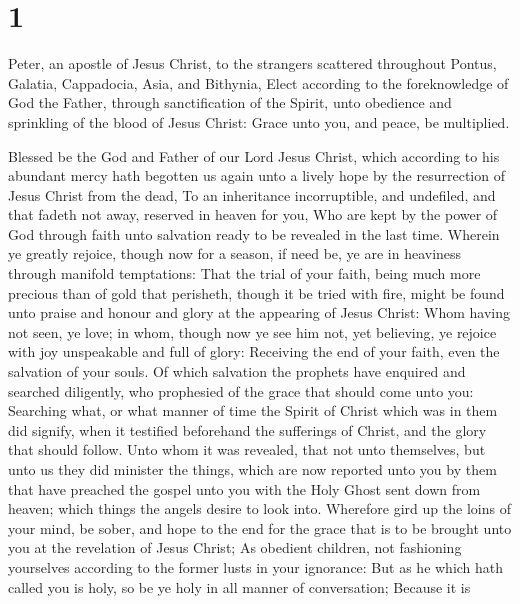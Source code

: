 \hypertarget{section}{%
\section{1}\label{section}}

 Peter, an apostle of Jesus Christ, to the strangers
scattered throughout Pontus, Galatia, Cappadocia, Asia, and Bithynia,
 Elect according to the foreknowledge of God the Father,
through sanctification of the Spirit, unto obedience and sprinkling of
the blood of Jesus Christ: Grace unto you, and peace, be multiplied.

 Blessed be the God and Father of our Lord Jesus Christ,
which according to his abundant mercy hath begotten us again unto a
lively hope by the resurrection of Jesus Christ from the dead,
 To an inheritance incorruptible, and undefiled, and that
fadeth not away, reserved in heaven for you,  Who are kept
by the power of God through faith unto salvation ready to be revealed in
the last time.  Wherein ye greatly rejoice, though now for a
season, if need be, ye are in heaviness through manifold temptations:
 That the trial of your faith, being much more precious than
of gold that perisheth, though it be tried with fire, might be found
unto praise and honour and glory at the appearing of Jesus Christ:
 Whom having not seen, ye love; in whom, though now ye see
him not, yet believing, ye rejoice with joy unspeakable and full of
glory:  Receiving the end of your faith, even the salvation
of your souls.  Of which salvation the prophets have
enquired and searched diligently, who prophesied of the grace that
should come unto you:  Searching what, or what manner of
time the Spirit of Christ which was in them did signify, when it
testified beforehand the sufferings of Christ, and the glory that should
follow.  Unto whom it was revealed, that not unto
themselves, but unto us they did minister the things, which are now
reported unto you by them that have preached the gospel unto you with
the Holy Ghost sent down from heaven; which things the angels desire to
look into.  Wherefore gird up the loins of your mind, be
sober, and hope to the end for the grace that is to be brought unto you
at the revelation of Jesus Christ;  As obedient children,
not fashioning yourselves according to the former lusts in your
ignorance:  But as he which hath called you is holy, so be
ye holy in all manner of conversation;  Because it is
